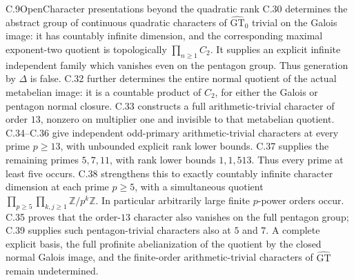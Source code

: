 \begin{statement}{C.9}{Open}{Character presentations beyond the quadratic rank}
C.30 determines the abstract group of continuous quadratic characters of
$\widehat{\mathrm{GT}}_0$ trivial on the Galois image: it has countably
infinite dimension, and the corresponding maximal exponent-two quotient
is topologically $\prod_{n\geq1}C_2$. It supplies an explicit infinite
independent family which vanishes even on the pentagon group. Thus
generation by $\Delta$ is false. C.32 further determines the entire
normal quotient of the actual metabelian image: it is a countable
product of $C_2$, for either the Galois or pentagon normal closure.
C.33 constructs a full arithmetic-trivial character of order
$13$, nonzero on multiplier one and invisible to that metabelian
quotient.
C.34--C.36 give independent odd-primary arithmetic-trivial
characters at every prime $p\geq13$, with unbounded explicit
rank lower bounds.
C.37 supplies the remaining primes $5,7,11$, with rank
lower bounds $1,1,513$.  Thus every prime at least five occurs.
C.38 strengthens this to exactly countably infinite character
dimension at each prime $p\geq5$, with a simultaneous quotient
$\prod_{p\geq5}\prod_{k,j\geq1}\mathbb Z/p^k\mathbb Z$.
In particular arbitrarily large finite $p$-power orders occur.
C.35 proves that the order-$13$ character also vanishes on the
full pentagon group; C.39 supplies such pentagon-trivial
characters also at $5$ and $7$.
A complete explicit basis, the full profinite abelianization of the quotient by the closed normal Galois
image, and the finite-order arithmetic-trivial characters of
$\widehat{\mathrm{GT}}$ remain undetermined.
\end{statement}
